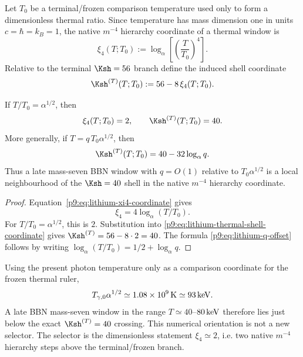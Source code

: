 \documentclass[12pt,a4paper]{article}
\begin{document}
\begin{definition}
\label{p9:def:lithium-native-thermal-coordinate}
Let \(T_0\) be a terminal/frozen comparison temperature used only to form a
dimensionless thermal ratio.  Since temperature has mass dimension one in units
\(c=\hbar=k_B=1\), the native \(m^{-4}\) hierarchy coordinate of a thermal
window is
\begin{equation}
\label{p9:eq:lithium-xi4-coordinate}
  \xi_4(T;T_0)
  :=
  \log_\alpha\!\left[\left(\frac{T}{T_0}\right)^4\right].
\end{equation}
Relative to the terminal \(\Ksh=56\) branch define the induced shell coordinate
\begin{equation}
\label{p9:eq:lithium-thermal-shell-coordinate}
  \Ksh^{(T)}(T;T_0):=56-8\,\xi_4(T;T_0).
\end{equation}
\end{definition}

\begin{lemma}[Two native steps place a thermal window on \(\Ksh=40\)]
\label{p9:lem:lithium-k40-placement}
If \(T/T_0=\alpha^{1/2}\), then
\begin{equation}
\label{p9:eq:lithium-two-step-placement}
  \xi_4(T;T_0)=2,
  \qquad
  \Ksh^{(T)}(T;T_0)=40 .
\end{equation}
More generally, if \(T=q\,T_0\alpha^{1/2}\), then
\begin{equation}
\label{p9:eq:lithium-q-offset}
  \Ksh^{(T)}(T;T_0)=40-32\log_\alpha q .
\end{equation}
Thus a late mass-seven BBN window with \(q=O(1)\) relative to
\(T_0\alpha^{1/2}\) is a local neighbourhood of the \(\Ksh=40\) shell in the
native \(m^{-4}\) hierarchy coordinate.
\end{lemma}

\begin{proof}
Equation~\eqref{p9:eq:lithium-xi4-coordinate} gives
\[
  \xi_4=4\log_\alpha(T/T_0).
\]
For \(T/T_0=\alpha^{1/2}\), this is \(2\).  Substitution into
\eqref{p9:eq:lithium-thermal-shell-coordinate} gives
\(\Ksh^{(T)}=56-8\cdot2=40\).  The formula
\eqref{p9:eq:lithium-q-offset} follows by writing
\(\log_\alpha(T/T_0)=1/2+\log_\alpha q\).
\end{proof}

Using the present photon temperature only as a comparison
coordinate for the frozen thermal ruler,
\[
  T_{\gamma,0}\alpha^{1/2}
  \simeq 1.08\times10^9\,{\rm K}
  \simeq 93\,{\rm keV}.
\]
A late BBN mass-seven window in the range \(T\simeq40\)--\(80\,{\rm keV}\)
therefore lies just below the exact \(\Ksh^{(T)}=40\) crossing.  This numerical
orientation is not a new selector.  The selector is the dimensionless statement
\(\xi_4\simeq2\), i.e. two native \(m^{-4}\) hierarchy steps above the
terminal/frozen branch.
\end{document}

